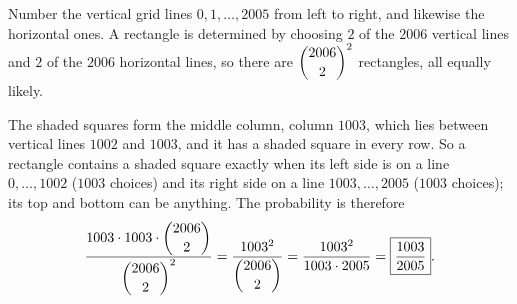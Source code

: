 Number the vertical grid lines $0,1,\dots,2005$ from left to right, and likewise the horizontal ones. A rectangle is determined by choosing $2$ of the $2006$ vertical lines and $2$ of the $2006$ horizontal lines, so there are $\dbinom{2006}{2}^2$ rectangles, all equally likely.

The shaded squares form the middle column, column $1003$, which lies between vertical lines $1002$ and $1003$, and it has a shaded square in every row. So a rectangle contains a shaded square exactly when its left side is on a line $0,\dots,1002$ ($1003$ choices) and its right side on a line $1003,\dots,2005$ ($1003$ choices); its top and bottom can be anything. The probability is therefore
\[\dfrac{1003\cdot1003\cdot\dbinom{2006}{2}}{\dbinom{2006}{2}^2}=\dfrac{1003^2}{\dbinom{2006}{2}}=\dfrac{1003^2}{1003\cdot2005}=\boxed{\dfrac{1003}{2005}}.\]
